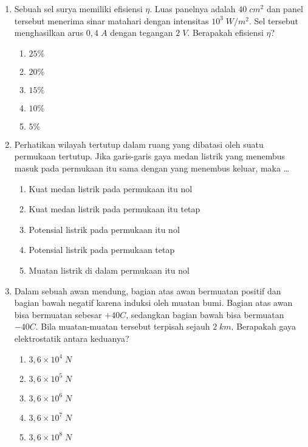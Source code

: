 \documentclass[A4,12PT, english, twocolumn]{journal}
\begin{document}
\begin{enumerate}
\item Sebuah sel surya memiliki efisiensi $\eta$. Luas panelnya adalah $40 \; cm^2$ dan panel tersebut menerima sinar matahari dengan intensitas $10^3 \; W/m^2$. Sel tersebut menghasilkan arus $0,4 \; A$ dengan tegangan $2 \; V$. Berapakah efisiensi $\eta$?
    \begin{enumerate}
        \item $25\%$
        \item $20\%$
        \item $15\%$
        \item $10\%$
        \item $5\%$
    \end{enumerate}
    
\item Perhatikan wilayah tertutup dalam ruang yang dibatasi oleh suatu permukaan tertutup. Jika garis-garis gaya medan listrik yang menembus masuk pada permukaan itu sama dengan yang menembus keluar, maka \dots
	\begin{enumerate}
		\item Kuat medan listrik pada permukaan itu nol
		\item Kuat medan listrik pada permukaan itu tetap
		\item Potensial listrik pada permukaan itu nol
		\item Potensial listrik pada permukaan tetap
		\item Muatan listrik di dalam permukaan itu nol
	\end{enumerate}
	
\item Dalam sebuah awan mendung, bagian atas awan bermuatan positif dan bagian bawah negatif karena induksi oleh muatan bumi. Bagian atas awan bisa bermuatan sebesar $+40C$, sedangkan bagian bawah bisa bermuatan $-40C$. Bila muatan-muatan tersebut terpisah sejauh $2 \; km$. Berapakah gaya elektrostatik antara keduanya?
   \begin{enumerate}
        \item $3,6 \times 10^4 \; N$
        \item $3,6 \times 10^5 \; N$
        \item $3,6 \times 10^6 \; N$
        \item $3,6 \times 10^7 \; N$
        \item $3,6 \times 10^8 \; N$
   \end{enumerate}
   

\end{enumerate}
\end{document}
